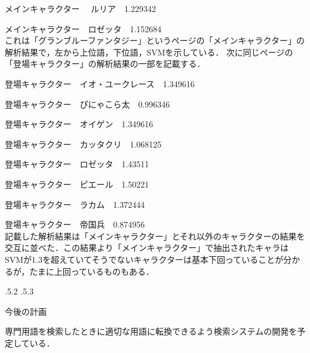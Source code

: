 \documentclass[uplatex]{jsarticle}
\makeatletter
\renewcommand{\section}{%
    \if@slide\clearpage\fi
    \@startsection{section}{1}{\z@}%
    {\Cvs \@plus.5\Cdp \@minus.2\Cdp}%
    {.5\Cvs \@plus.3\Cdp}%
    {\normalfont\raggedright}}
\makeatother
\begin{document}
メインキャラクター 　ルリア　1.229342

メインキャラクター　ロゼッタ　1.152684\\
これは「グランブルーファンタジー」というページの「メインキャラクター」の解析結果で，左から上位語，下位語，SVMを示している．
次に同じページの「登場キャラクター」の解析結果の一部を記載する．

登場キャラクター　イオ・ユークレース　1.349616

登場キャラクター　ぴにゃこら太　0.996346

登場キャラクター　オイゲン　1.349616

登場キャラクター　カッタクリ　1.068125

登場キャラクター　ロゼッタ　1.43511

登場キャラクター　ピエール　1.50221

登場キャラクター　ラカム　1.372444

登場キャラクター　帝国兵　0.874956\\
記載した解析結果は「メインキャラクター」とそれ以外のキャラクターの結果を交互に並べた．この結果より「メインキャラクター」で抽出されたキャラはSVMが1.3を超えていてそうでないキャラクターは基本下回っていることが分かるが，たまに上回っているものもある．



\section{今後の計画}


専門用語を検索したときに適切な用語に転換できるよう検索システムの開発を予定している．



\end{document}
